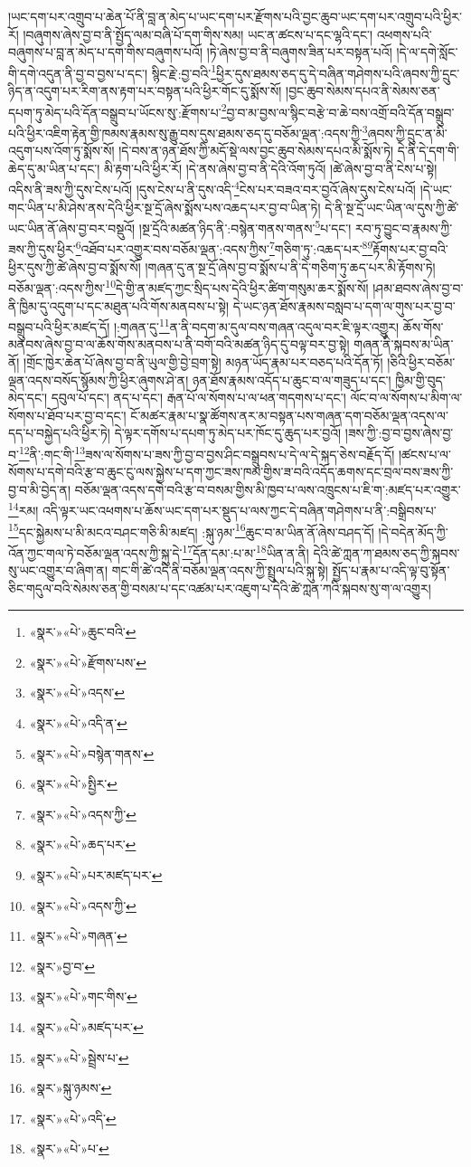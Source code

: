 །ཡང་དག་པར་འགྲུབ་པ་ཆེན་པོ་ནི་བླ་ན་མེད་པ་ཡང་དག་པར་རྫོགས་པའི་བྱང་ཆུབ་ཡང་དག་པར་འགྲུབ་པའི་ཕྱིར་རོ། །བཞུགས་ཞེས་བྱ་བ་ནི་སྤྱོད་ལམ་བཞི་པོ་དག་གིས་སམ། ཡང་ན་ཚངས་པ་དང་ལྷའི་དང་། འཕགས་པའི་བཞུགས་པ་བླ་ན་མེད་པ་དག་གིས་བཞུགས་པའོ། །ཏེ་ཞེས་བྱ་བ་ནི་བཞུགས་ཟིན་པར་བསྟན་པའོ། །དེ་ལ་དགེ་སློང་གི་དགེ་འདུན་ནི་བྱ་བ་བྱས་པ་དང་། སྙིང་རྗེ་:བྱ་བའི་\footnote{«སྣར་»«པེ་»ཆུང་བའི་}ཕྱིར་དུས་ཐམས་ཅད་དུ་དེ་བཞིན་གཤེགས་པའི་ཞབས་ཀྱི་དྲུང་ཉིད་ན་འདུག་པར་རིག་ནས་རྟག་པར་བསྟན་པའི་ཕྱིར་གོང་དུ་སྨོས་སོ། །བྱང་ཆུབ་སེམས་དཔའ་ནི་སེམས་ཅན་དཔག་ཏུ་མེད་པའི་དོན་བསྒྲུབ་པ་ཡོངས་སུ་:རྫོགས་པ་\footnote{«སྣར་»«པེ་»རྫོགས་པས་}བྱ་བ་མ་བྱས་ལ་སྙིང་བརྩེ་བ་ཆེ་བས་འགྲོ་བའི་དོན་བསྒྲུབ་པའི་ཕྱིར་འཇིག་རྟེན་གྱི་ཁམས་རྣམས་སུ་རྒྱུ་བས་དུས་ཐམས་ཅད་དུ་བཅོམ་ལྡན་:འདས་ཀྱི་\footnote{«སྣར་»«པེ་»འདས་}ཞབས་ཀྱི་དྲུང་ན་མི་འདུག་པས་འོག་ཏུ་སྨོས་སོ། །དེ་བས་ན་ཉན་ཐོས་ཀྱི་མདོ་སྡེ་ལས་བྱང་ཆུབ་སེམས་དཔའ་མི་སྨོས་ཏེ། དེ་ནི་དེ་དག་གི་ཆེད་དུ་མ་ཡིན་པ་དང་། མི་རྟག་པའི་ཕྱིར་རོ། །དེ་ནས་ཞེས་བྱ་བ་ནི་དེའི་འོག་ཏུའོ། །ཚེ་ཞེས་བྱ་བ་ནི་ངེས་པ་སྟེ། འདིས་ནི་ཟས་ཀྱི་དུས་ངེས་པའོ། །དུས་ངེས་པ་ནི་དུས་འདི་\footnote{«སྣར་»«པེ་»འདི་ན་}ངེས་པར་བཟའ་བར་བྱའོ་ཞེས་དུས་ངེས་པའོ། །དེ་ཡང་གང་ཡིན་པ་མི་ཤེས་ནས་དེའི་ཕྱིར་སྔ་དྲོ་ཞེས་སྨོས་པས་འཆད་པར་བྱ་བ་ཡིན་ཏེ། དེ་ནི་སྔ་དྲོ་ཡང་ཡིན་ལ་དུས་ཀྱི་ཚེ་ཡང་ཡིན་ནོ་ཞེས་བྱ་བར་བསྡུའོ། །སྔ་དྲོའི་མཚན་ཉིད་ནི་:བསྙེན་གནས་གནས་\footnote{«སྣར་»«པེ་»བསྙེན་གནས་}པ་དང་། རབ་ཏུ་བྱུང་བ་རྣམས་ཀྱི་ཟས་ཀྱི་དུས་ཕྱིར་\footnote{«སྣར་»«པེ་»སྤྱིར་}འཐོབ་པར་འགྱུར་བས་བཅོམ་ལྡན་:འདས་ཀྱིས་\footnote{«སྣར་»«པེ་»འདས་ཀྱི་}གཅིག་ཏུ་:འཆད་པར་\footnote{«སྣར་»«པེ་»ཆད་པར་}\footnote{«སྣར་»«པེ་»པར་མཛད་པར་}རྟོགས་པར་བྱ་བའི་ཕྱིར་དུས་ཀྱི་ཚེ་ཞེས་བྱ་བ་སྨོས་སོ། །གཞན་དུ་ན་སྔ་དྲོ་ཞེས་བྱ་བ་སྨོས་པ་ནི་དེ་གཅིག་ཏུ་ཆད་པར་མི་རྟོགས་ཏེ། བཅོམ་ལྡན་:འདས་ཀྱིས་\footnote{«སྣར་»«པེ་»འདས་ཀྱི་}དེ་གྱི་ན་མཛད་ཀྱང་སྲིད་པས་དེའི་ཕྱིར་ཚིག་གསུམ་ཆར་སྨོས་སོ། །ཤམ་ཐབས་ཞེས་བྱ་བ་ནི་ཁྱིམ་དུ་འདུག་པ་དང་མཐུན་པའི་གོས་མནབས་པ་སྟེ། དེ་ཡང་ཉན་ཐོས་རྣམས་བསླབ་པ་དག་ལ་གུས་པར་བྱ་བ་བསྒྲུབ་པའི་ཕྱིར་མཛད་དོ། །:གཞན་དུ་\footnote{«སྣར་»«པེ་»གཞན་}ན་ནི་བདག་མ་དུལ་བས་གཞན་འདུལ་བར་ཇི་ལྟར་འགྱུར། ཆོས་གོས་མནབས་ཞེས་བྱ་བ་ལ་ཆོས་གོས་མནབས་པ་ནི་བགོ་བའི་མཚན་ཉིད་དུ་བལྟ་བར་བྱ་སྟེ། གཞན་ནི་སྐབས་མ་ཡིན་ནོ། །གྲོང་ཁྱེར་ཆེན་པོ་ཞེས་བྱ་བ་ནི་ཡུལ་གྱི་བྱེ་བྲག་སྟེ། མཉན་ཡོད་རྣམ་པར་བཅད་པའི་དོན་ཏོ། །ཅིའི་ཕྱིར་བཅོམ་ལྡན་འདས་བསོད་སྙོམས་ཀྱི་ཕྱིར་ཞུགས་ཤེ་ན། ཉན་ཐོས་རྣམས་འདོད་པ་ཆུང་བ་ལ་གཟུད་པ་དང་། ཁྱིམ་གྱི་བུད་མེད་དང་། དབུལ་པོ་དང་། ནད་པ་དང་། རྒན་པོ་ལ་སོགས་པ་ལ་ཕན་གདགས་པ་དང་། ལོང་བ་ལ་སོགས་པ་མིག་ལ་སོགས་པ་ཐོབ་པར་བྱ་བ་དང་། ངོ་མཚར་རྣམ་པ་སྣ་ཚོགས་ནར་མ་བསྟན་པས་གཞན་དག་བཅོམ་ལྡན་འདས་ལ་དད་པ་བསྐྱེད་པའི་ཕྱིར་ཏེ། དེ་ལྟར་དགོས་པ་དཔག་ཏུ་མེད་པར་ཁོང་དུ་ཆུད་པར་བྱའོ། །ཟས་ཀྱི་:བྱ་བ་བྱས་ཞེས་བྱ་བ་\footnote{«སྣར་»བྱ་བ་}ནི་:གང་གི་\footnote{«སྣར་»«པེ་»གང་གིས་}ཟས་ལ་སོགས་པ་ཟས་ཀྱི་བྱ་བ་བྱས་ཤིང་བསྒྲུབས་པ་དེ་ལ་དེ་སྐད་ཅེས་བརྗོད་དོ། །ཚངས་པ་ལ་སོགས་པ་དགེ་བའི་རྩ་བ་ཆུང་ངུ་ལས་སྐྱེས་པ་དག་ཀྱང་ཟས་ཁམ་གྱིས་ཟ་བའི་འདོད་ཆགས་དང་བྲལ་བས་ཟས་ཀྱི་བྱ་བ་མི་བྱེད་ན། བཅོམ་ལྡན་འདས་དགེ་བའི་རྩ་བ་བསམ་གྱིས་མི་ཁྱབ་པ་ལས་འཁྲུངས་པ་ཇི་ག་:མཛད་པར་འགྱུར་\footnote{«སྣར་»«པེ་»མཛད་པར་}རམ། འདི་ལྟར་ཡང་འཕགས་པ་ཆོས་ཡང་དག་པར་སྡུད་པ་ལས་ཀྱང་དེ་བཞིན་གཤེགས་པ་ནི་:བསྒྲིབས་པ་\footnote{«སྣར་»«པེ་»སྦྲེས་པ་}དང་སྐྱེམས་པ་མི་མངའ་བཤང་གཅི་མི་མཛད། :སྐུ་ཉམ་\footnote{«སྣར་»སྐུ་ཉམས་}ཆུང་བ་མ་ཡིན་ནོ་ཞེས་བཤད་དོ། །དེ་བདེན་མོད་ཀྱི་འོན་ཀྱང་གལ་ཏེ་བཅོམ་ལྡན་འདས་ཀྱི་སྐུ་དེ་\footnote{«སྣར་»«པེ་»འདི་}དོན་དམ་:པ་མ་\footnote{«སྣར་»«པེ་»པ་}ཡིན་ན་ནི། དེའི་ཚེ་ཀླན་ཀ་ཐམས་ཅད་ཀྱི་སྐབས་སུ་ཡང་འགྱུར་བ་ཞིག་ན། གང་གི་ཚེ་འདི་ནི་བཅོམ་ལྡན་འདས་ཀྱི་སྤྲུལ་པའི་སྐུ་སྟེ། སྤྱོད་པ་རྣམ་པ་འདི་ལྟ་བུ་སྟོན་ཅིང་གདུལ་བའི་སེམས་ཅན་གྱི་བསམ་པ་དང་འཚམ་པར་འཇུག་པ་དེའི་ཚེ་ཀླན་ཀའི་སྐབས་སུ་ག་ལ་འགྱུར། 